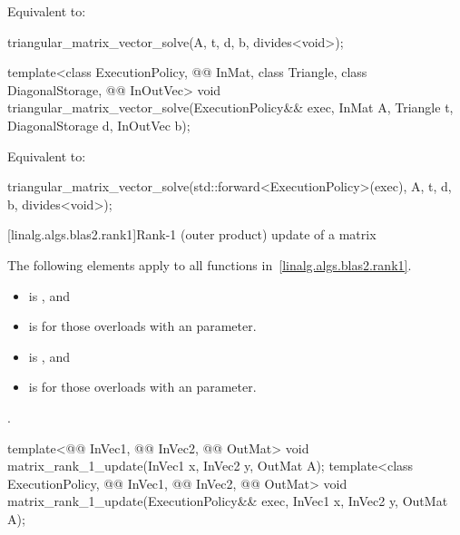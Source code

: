 \begin{itemdescr}
\pnum
\effects
Equivalent to:
\begin{codeblock}
triangular_matrix_vector_solve(A, t, d, b, divides<void>{});
\end{codeblock}
\end{itemdescr}

%
\begin{itemdecl}
template<class ExecutionPolicy,
         @@ InMat, class Triangle, class DiagonalStorage, @@ InOutVec>
  void triangular_matrix_vector_solve(ExecutionPolicy&& exec,
                                      InMat A, Triangle t, DiagonalStorage d, InOutVec b);
\end{itemdecl}

\begin{itemdescr}
\pnum
\effects
Equivalent to:
\begin{codeblock}
triangular_matrix_vector_solve(std::forward<ExecutionPolicy>(exec),
                               A, t, d, b, divides<void>{});
\end{codeblock}
\end{itemdescr}

[linalg.algs.blas2.rank1]{Rank-1 (outer product) update of a matrix}

\pnum
The following elements apply to all functions in~\ref{linalg.algs.blas2.rank1}.

\pnum
\mandates
\begin{itemize}
\item
{}
is , and
\item
{}
is  for those overloads with an  parameter.
\end{itemize}

\pnum
\expects
\begin{itemize}
\item
{}
is , and
\item
{}
is  for those overloads with an  parameter.
\end{itemize}

\pnum
\complexity
{}.

%
\begin{itemdecl}
template<@@ InVec1, @@ InVec2, @@ OutMat>
  void matrix_rank_1_update(InVec1 x, InVec2 y, OutMat A);
template<class ExecutionPolicy, @@ InVec1, @@ InVec2, @@ OutMat>
  void matrix_rank_1_update(ExecutionPolicy&& exec, InVec1 x, InVec2 y, OutMat A);
\end{itemdecl}

